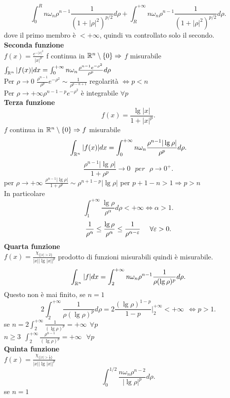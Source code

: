 \documentclass[12px]{article}
\begin{document}
\[
\int_0^{R}n\omega_n\rho^{n-1}\frac{1}{(1 + |\rho|^2)^{p/2}}d\rho + \int_R^{+\infty}n\omega_n\rho^{n-1}\frac{1}{(1 + |\rho|^2)^{p/2}}d\rho
.\] 
dove il primo membro è $< +\infty$, quindi va controllato solo il secondo.\\
\textbf{Seconda funzione}\\
$f(x) = \frac{e^{-|x|^2}}{|x|^p}$ f continua in  $\mathbb{R}^n\setminus\{0\} \Rightarrow $ $f$ misurabile\\
$\int_{\mathbb{R}^n} |f(x)|dx= \int_0^{+\infty}n\omega_n\frac{\rho^{n-1}e^{-\rho^2}}{\rho^p}d\rho$ \\
Per $\rho \rightarrow 0$ $\frac{\rho^{n-1}}{\rho^p}e^{-\rho^2}\sim \frac 1{\rho^{p-n+1}}$ regolarità $ \Leftrightarrow p < n$\\
Per  $\rho \rightarrow +\infty \rho^{n-1-p}e^{-\rho^2}$ è integrabile $\forall p$\\
\textbf{Terza funzione}\\
 \[
	 f(x) =\frac{\lg|x|}{1 + |x|^p}
.\] 
$f$ continua in $\mathbb{R}^n\setminus\{0\} \Rightarrow f$  misurabile
\[
\int_{\mathbb{R}^n}|f(x)|dx = \int_0^{+\infty}n\omega_n\frac{\rho^{n-1}|\lg\rho|}{\rho^p}d\rho
.\] 
\[
	\frac{\rho^{n-1}|\lg\rho|}{1+\rho^p} \rightarrow 0\ \ \ per \ \ \ \rho \rightarrow 0^+
.\] 
per $\rho \rightarrow +\infty$ $\frac{\rho^{n-1}|\lg\rho|}{1 + \rho^p} \sim \rho^{n+1-p}|\lg \rho|$ per $p + 1 - n > 1  \Rightarrow  p > n$ \\
In particolare
\[
	\int^{+\infty}_1\frac{\lg\rho}{\rho^\alpha}d\rho <+\infty \Leftrightarrow \alpha > 1
.\] 
\[
	\frac{1}{\rho^\alpha}\leq \frac{\lg \rho}{\rho^\alpha} \leq \frac 1{\rho^{\alpha-\varepsilon}}\ \ \ \ \forall \varepsilon > 0
.\] 
\textbf{Quarta funzione}\\
$\displaystyle f(x) = \frac{\chi_{\{|x|>2\}}}{|x||\lg|x||^p}$ prodotto di funzioni misurabili quindi è misurabile.\\
\[
	\int_{\mathbb{R}^n}|f|dx = \int_2^{+\infty}n\omega_n\rho^{n-1}\frac{1}{\rho(\lg\rho)^p}d\rho
.\] 
Questo non è mai finito, se $n = 1$
 \[
	 2\int_2^{+\infty}\frac{1}{\rho(\lg\rho)^p}d\rho = 2\frac{(\lg\rho)^{1-p}}{1-p}|^{+\infty}_2<+\infty \  \ \Leftrightarrow p > 1
.\] 
se $n = 2 \int_2^{+\infty}\frac{1}{(\lg\rho)^p} = +\infty \ \ \forall p$ \\
$n \geq 3\ \ \int^{+\infty}_2\frac{\rho^{n-1}}{(\lg\rho)^p} = +\infty \ \ \ \forall p$\\
\textbf{Quinta funzione}\\
$f(x) = \frac{\chi_{\{|x|>\frac 12\}}}{|x||\lg|x||^p}$ 
\[
\int_0^{1/2}\frac{n\omega_n \rho^{n-2}}{|\lg\rho|^p}d\rho
.\] 
se $n= 1$
\end{document}
